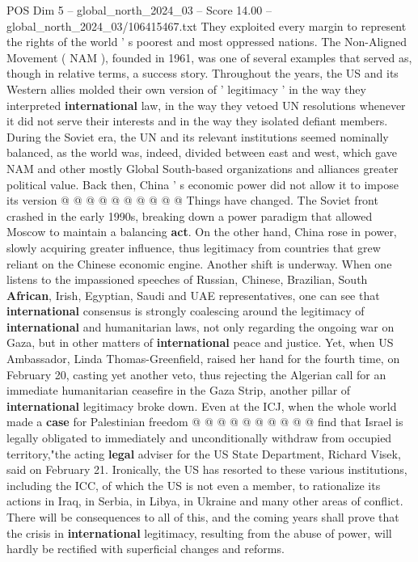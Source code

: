 \begin{textsample}{POS Dim 5 – global\_north\_2024\_03 – Score 14.00 – global\_north\_2024\_03/106415467.txt}
They exploited every margin to represent the rights of the world ' s poorest and most oppressed nations.
The Non-Aligned Movement ( NAM ), founded in 1961, was one of several examples that served as, though in relative terms, a success story.
Throughout the years, the US and its Western allies molded their own version of ' legitimacy ' in the way they interpreted \textbf{international} law, in the way they vetoed UN resolutions whenever it did not serve their interests and in the way they isolated defiant members.
During the Soviet era, the UN and its relevant institutions seemed nominally balanced, as the world was, indeed, divided between east and west, which gave NAM and other mostly Global South-based organizations and alliances greater political value.
Back then, China ' s economic power did not allow it to impose its version @ @ @ @ @ @ @ @ @ @ Things have changed.
The Soviet front crashed in the early 1990s, breaking down a power paradigm that allowed Moscow to maintain a balancing \textbf{act}.
On the other hand, China rose in power, slowly acquiring greater influence, thus legitimacy from countries that grew reliant on the Chinese economic engine.
Another shift is underway.
When one listens to the impassioned speeches of Russian, Chinese, Brazilian, South \textbf{African}, Irish, Egyptian, Saudi and UAE representatives, one can see that \textbf{international} consensus is strongly coalescing around the legitimacy of \textbf{international} and humanitarian laws, not only regarding the ongoing war on Gaza, but in other matters of \textbf{international} peace and justice.
Yet, when US Ambassador, Linda Thomas-Greenfield, raised her hand for the fourth time, on February 20, casting yet another veto, thus rejecting the Algerian call for an immediate humanitarian ceasefire in the Gaza Strip, another pillar of \textbf{international} legitimacy broke down.
Even at the ICJ, when the whole world made a \textbf{case} for Palestinian freedom @ @ @ @ @ @ @ @ @ @ find that Israel is legally obligated to immediately and unconditionally withdraw from occupied territory,"the acting \textbf{legal} adviser for the US State Department, Richard Visek, said on February 21.
Ironically, the US has resorted to these various institutions, including the ICC, of which the US is not even a member, to rationalize its actions in Iraq, in Serbia, in Libya, in Ukraine and many other areas of conflict.
There will be consequences to all of this, and the coming years shall prove that the crisis in \textbf{international} legitimacy, resulting from the abuse of power, will hardly be rectified with superficial changes and reforms.

\end{textsample}
